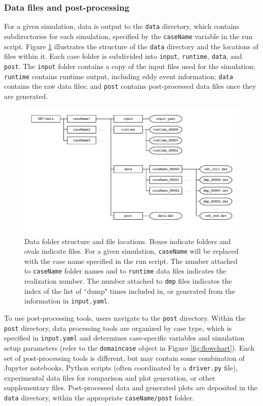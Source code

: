 \documentclass[preprint,12pt, a4paper]{elsarticle}
\begin{document}
\subsubsection{Data files and post-processing}

For a given simulation, data is output to the \texttt{data} directory, which contains subdirectories for each simulation, specified by the \texttt{caseName} variable in the run script. Figure \ref{fig:data_folder_structure} illustrates the structure of the \texttt{data} directory and the locations of files within it. Each case folder is subdivided into \texttt{input}, \texttt{runtime}, \texttt{data}, and \texttt{post}. The \texttt{input} folder contains a copy of the input files used for the simulation; \texttt{runtime} contains runtime output, including eddy event information; \texttt{data} contains the raw data files; and \texttt{post} contains post-processed data files once they are generated. 

\begin{figure}
	\centering
    \includegraphics[width=\textwidth]{fig_data_folder_structure.pdf} 
	\caption{Data folder structure and file locations. Boxes indicate folders and ovals indicate files. For a given simulation, \texttt{caseName} will be replaced with the case name specified in the run script. The number attached to \texttt{caseName} folder names and to \texttt{runtime} data files indicates the realization number. The number attached to \texttt{dmp} files indicates the index of the list of ``dump" times included in, or generated from the information in \texttt{input.yaml}.}
\label{fig:data_folder_structure}
\end{figure}

To use post-processing tools, users navigate to the \texttt{post} directory. Within the \texttt{post} directory, data processing tools are organized by case type, which is specified in \texttt{input.yaml} and determines case-specific variables and simulation setup parameters (refer to the \texttt{domaincase} object in Figure \ref{fig:flowchart}). Each set of post-processing tools is different, but may contain some combination of Jupyter notebooks, Python scripts (often coordinated by a \texttt{driver.py} file), experimental data files for comparison and plot generation, or other supplementary files. Post-processed data and generated plots are deposited in the \texttt{data} directory, within the appropriate \texttt{caseName/post} folder.  
\end{document}
